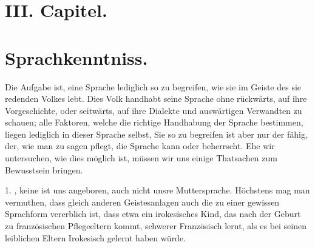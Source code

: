 \clearpage{}
\section*{III. Capitel.}
\section*{Sprachkenntniss.}\label{II.III.1}

Die Aufgabe ist, eine Sprache lediglich so zu begreifen, wie sie im Geiste des sie redenden Volkes lebt. Dies Volk handhabt seine Sprache ohne rückwärts, auf ihre Vorgeschichte, oder seitwärts, auf ihre Dialekte und auswärtigen Verwandten zu schauen; alle Faktoren, welche die richtige Handhabung der Sprache bestimmen, liegen lediglich in dieser Sprache selbst,  Sie so zu begreifen ist aber nur der fähig, der, wie man zu sagen pflegt, die Sprache kann oder beherrscht. Ehe wir untersuchen, wie dies möglich ist, müssen wir uns einige Thatsachen zum Bewusstsein bringen.

\label{II.III.erlernt} 1. , keine ist uns angeboren, auch nicht unsre Muttersprache. Höchstens mag man vermuthen, dass gleich anderen Geistesanlagen auch die zu einer gewissen Sprachform vererblich ist, dass etwa ein irokesisches Kind, das nach der Geburt zu französischen Pflegeeltern kommt, \label{sp.62} schwerer Französisch lernt, als es bei seinen leiblichen Eltern Irokesisch gelernt haben würde.

